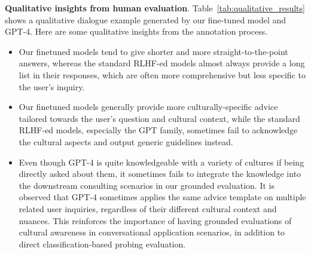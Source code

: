 \documentclass{article} %
\begin{document}
\noindent\textbf{Qualitative insights from human evaluation}. Table~\ref{tab:qualitative_results} shows a qualitative dialogue example generated by our fine-tuned model and GPT-4. Here are some qualitative insights from the annotation process.

\begin{itemize}
    
    \item Our finetuned models tend to give shorter and more straight-to-the-point answers, whereas the standard RLHF-ed models almost always provide a long list in their responses, which are often more comprehensive but less specific to the user's inquiry.
    \item Our finetuned models generally provide more culturally-specific advice tailored towards the user's question and cultural context, while the standard RLHF-ed models, especially the GPT family, sometimes fail to acknowledge the cultural aspects and output generic guidelines instead.
    \item Even though GPT-4 is quite knowledgeable with a variety of cultures if being directly asked about them, it sometimes fails to integrate the knowledge into the downstream consulting scenarios in our grounded evaluation. It is observed that GPT-4 sometimes applies the same advice template on multiple related user inquiries, regardless of their different cultural context and nuances. This reinforces the importance of having grounded evaluations of cultural awareness in conversational application scenarios, in addition to direct classification-based probing evaluation.
 
\end{itemize}
\end{document}
